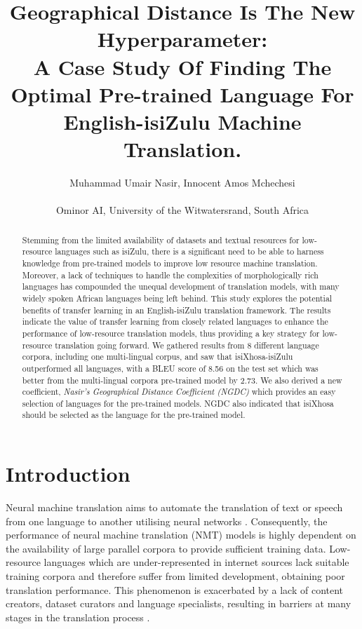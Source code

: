 \documentclass[11pt]{article}
\title{Geographical Distance Is The New Hyperparameter:\\ { A Case Study Of Finding The Optimal Pre-trained Language For English-isiZulu Machine Translation.}}
\author{\normalsize Muhammad Umair Nasir, Innocent Amos Mchechesi \\\\
  \footnotesize
   Ominor AI,  University of the Witwatersrand, South Africa}
\begin{document}
\maketitle
\begin{abstract}
Stemming from the limited availability of datasets and textual resources for low-resource languages such as isiZulu, there is a significant need to be able to harness knowledge from pre-trained models to improve low resource machine translation. Moreover, a lack of techniques to handle the complexities of morphologically rich languages has compounded the unequal development of translation models, with many widely spoken African languages being left behind. This study explores the potential benefits of transfer learning in an English-isiZulu translation framework. The results indicate the value of transfer learning from closely related languages to enhance the performance of low-resource translation models, thus providing a key strategy for low-resource translation going forward. We gathered results from 8 different language corpora, including one multi-lingual corpus, and saw that isiXhosa-isiZulu outperformed all languages, with a BLEU score of 8.56 on the test set which was better from the multi-lingual corpora pre-trained model by 2.73. We also derived a new coefficient, \emph{Nasir's Geographical Distance Coefficient (NGDC)} which provides an easy selection of languages for the pre-trained models. NGDC also indicated that isiXhosa should be selected as the language for the pre-trained model.
\end{abstract}

\section{Introduction}

Neural machine translation aims to automate the translation of text or speech from one language to another utilising neural networks \citep{nyoni2021low}. Consequently, the performance of neural machine translation (NMT) models is highly dependent on the availability of large parallel corpora to provide sufficient training data. Low-resource languages which are under-represented in internet sources lack suitable training corpora and therefore suffer from limited development, obtaining poor translation performance. This phenomenon is exacerbated by a lack of content creators, dataset curators and language specialists, resulting in barriers at many stages in the translation process \citep{lakew2020low,zoph2016transfer,sennrich2019revisiting}.
\end{document}

